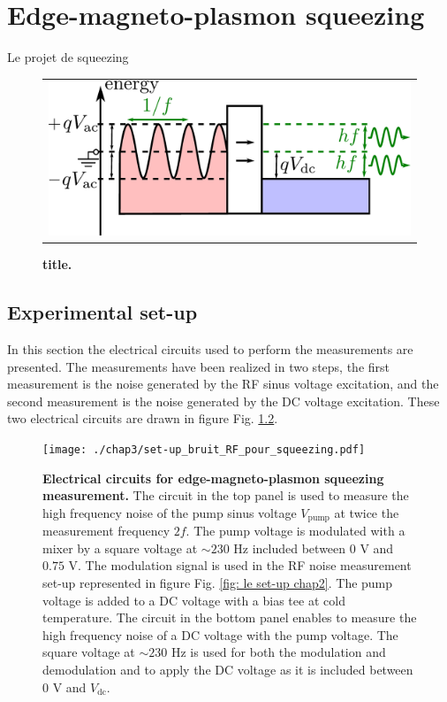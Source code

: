 \chapter{Edge-magneto-plasmon squeezing}

Le projet de squeezing

\begin{figure}[hptb]
	\begin{center}
		\begin{tabular}{c}
			 \includegraphics[width = 6.5 cm]{./chap3/noise_schematics}
		\end{tabular}
	\end{center}
	
	\caption{\textbf{title.}}
	\label{fig: squeezing principle schematics}
\end{figure}

\section{Experimental set-up}

In this section the electrical circuits used to perform the measurements are presented.
The measurements have been realized in two steps, the first measurement is the noise generated by the RF sinus voltage excitation, and the second measurement is the noise generated by the DC voltage excitation.
These two electrical circuits are drawn in figure Fig. \ref{fig: set-up chap 3}.

\begin{figure}
	\centering
	\texttt{[image: ./chap3/set-up\_bruit\_RF\_pour\_squeezing.pdf]}
	\caption{\textbf{Electrical circuits for edge-magneto-plasmon squeezing measurement.} The circuit in the top panel is used to measure the high frequency noise of the pump sinus voltage $V_{\mathrm{pump}}$ at twice the measurement frequency $2f$. The pump voltage is modulated with a mixer by a square voltage at $\sim 230$ Hz included between $0$ V and $0.75$ V. The modulation signal is used in the RF noise measurement set-up represented in figure Fig. \ref{fig: le set-up chap2}. The pump voltage is added to a DC voltage with a bias tee at cold temperature. The circuit in the bottom panel enables to measure the high frequency noise of a DC voltage with the pump voltage. The square voltage at $\sim 230$ Hz is used for both the modulation and demodulation and to apply the DC voltage as it is included between $0$ V and $V_{\mathrm{dc}}$.}
	\label{fig: set-up chap 3}
\end{figure}

